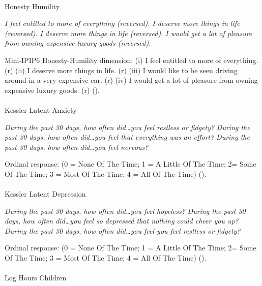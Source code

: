 \documentclass[
  single column]{article}
\makeatletter
\let\oldparagraph\paragraph
\renewcommand{\paragraph}{
    \@ifstar
      \xxxParagraphStar
      \xxxParagraphNoStar
  }
\newcommand{\xxxParagraphStar}[1]{\oldparagraph*{#1}\mbox{}}
\newcommand{\xxxParagraphNoStar}[1]{\oldparagraph{#1}\mbox{}}
\makeatother
\begin{document}
\paragraph{Honesty Humility}\label{honesty-humility}

\emph{I feel entitled to more of everything (reversed).} \emph{I deserve
more things in life (reversed).} \emph{I deserve more things in life
(reversed).} \emph{I would get a lot of pleasure from owning expensive
luxury goods (reversed).}

Mini-IPIP6 Honesty-Humility dimension: (i) I feel entitled to more of
everything. (r) (ii) I deserve more things in life. (r) (iii) I would
like to be seen driving around in a very expensive car. (r) (iv) I would
get a lot of pleasure from owning expensive luxury goods. (r)
().

\paragraph{Kessler Latent Anxiety}\label{kessler-latent-anxiety}

\emph{During the past 30 days, how often did\ldots you feel restless or
fidgety?} \emph{During the past 30 days, how often did\ldots you feel
that everything was an effort?} \emph{During the past 30 days, how often
did\ldots you feel nervous?}

Ordinal response: (0 = None Of The Time; 1 = A Little Of The Time; 2=
Some Of The Time; 3 = Most Of The Time; 4 = All Of The Time)
().

\paragraph{Kessler Latent Depression}\label{kessler-latent-depression}

\emph{During the past 30 days, how often did\ldots you feel hopeless?}
\emph{During the past 30 days, how often did\ldots you feel so depressed
that nothing could cheer you up?} \emph{During the past 30 days, how
often did\ldots you feel you feel restless or fidgety?}

Ordinal response: (0 = None Of The Time; 1 = A Little Of The Time; 2=
Some Of The Time; 3 = Most Of The Time; 4 = All Of The Time)
().

\paragraph{Log Hours Children}\label{log-hours-children}
\end{document}

